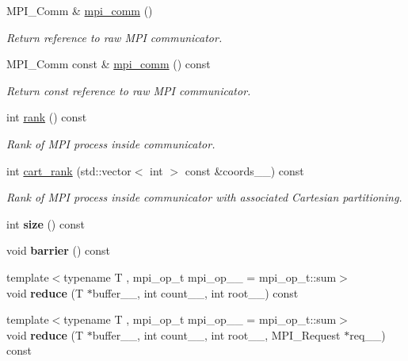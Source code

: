 \begin{DoxyCompactItemize}
M\+P\+I\+\_\+\+Comm \& \hyperlink{classsddk_1_1_communicator_a7e698b55afcbb987e494a831f76d8b68}{mpi\+\_\+comm} ()
\begin{DoxyCompactList}\small\item\em Return reference to raw M\+P\+I communicator. \end{DoxyCompactList}\item 
M\+P\+I\+\_\+\+Comm const \& \hyperlink{classsddk_1_1_communicator_a112575fbbdb412c7f44275105e8f33bc}{mpi\+\_\+comm} () const 
\begin{DoxyCompactList}\small\item\em Return const reference to raw M\+P\+I communicator. \end{DoxyCompactList}\item 
int \hyperlink{classsddk_1_1_communicator_ad74faba0835ab4db65c1041e2c8e3d44}{rank} () const 
\begin{DoxyCompactList}\small\item\em Rank of M\+P\+I process inside communicator. \end{DoxyCompactList}\item 
int \hyperlink{classsddk_1_1_communicator_ae4acf45099468ce141f5b21a9ce24386}{cart\+\_\+rank} (std\+::vector$<$ int $>$ const \&coords\+\_\+\+\_\+) const 
\begin{DoxyCompactList}\small\item\em Rank of M\+P\+I process inside communicator with associated Cartesian partitioning. \end{DoxyCompactList}\item 
\hypertarget{classsddk_1_1_communicator_a9527b11483609b4c74839f534401f207}{}int {\bfseries size} () const \label{classsddk_1_1_communicator_a9527b11483609b4c74839f534401f207}

\item 
\hypertarget{classsddk_1_1_communicator_a4ba503d3fc81a8674dbfc53076fba198}{}void {\bfseries barrier} () const \label{classsddk_1_1_communicator_a4ba503d3fc81a8674dbfc53076fba198}

\item 
\hypertarget{classsddk_1_1_communicator_aa9631a9cd3081dcaa486b68f6b7bf9f1}{}{\footnotesize template$<$typename T , mpi\+\_\+op\+\_\+t mpi\+\_\+op\+\_\+\+\_\+ = mpi\+\_\+op\+\_\+t\+::sum$>$ }\\void {\bfseries reduce} (T $\ast$buffer\+\_\+\+\_\+, int count\+\_\+\+\_\+, int root\+\_\+\+\_\+) const \label{classsddk_1_1_communicator_aa9631a9cd3081dcaa486b68f6b7bf9f1}

\item 
\hypertarget{classsddk_1_1_communicator_a86fd6a51b1b557638ffda24510b06569}{}{\footnotesize template$<$typename T , mpi\+\_\+op\+\_\+t mpi\+\_\+op\+\_\+\+\_\+ = mpi\+\_\+op\+\_\+t\+::sum$>$ }\\void {\bfseries reduce} (T $\ast$buffer\+\_\+\+\_\+, int count\+\_\+\+\_\+, int root\+\_\+\+\_\+, M\+P\+I\+\_\+\+Request $\ast$req\+\_\+\+\_\+) const \label{classsddk_1_1_communicator_a86fd6a51b1b557638ffda24510b06569}


\end{DoxyCompactItemize}
